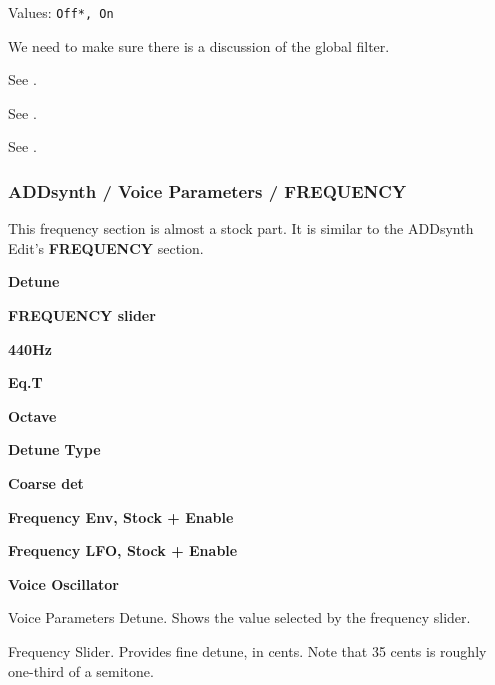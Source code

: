    Values: \texttt{Off*, On}

   We need to make sure there is a discussion of the global filter.

   See .

   See .

   See .

\subsubsection{ADDsynth / Voice Parameters / FREQUENCY}
\label{subsubsec:addsynth_voice_parameters_frequency}

   This frequency section is almost a stock part.
   It is similar to the ADDsynth Edit's \textbf{FREQUENCY} section.

   \begin{enumber}
      \item \textbf{Detune}
      \item \textbf{FREQUENCY slider}
      \item \textbf{440Hz}          %
      \item \textbf{Eq.T}          %
      \item \textbf{Octave}
      \item \textbf{Detune Type}
      \item \textbf{Coarse det}
      \item \textbf{Frequency Env, Stock + Enable}
      \item \textbf{Frequency LFO, Stock + Enable}
      \item \textbf{Voice Oscillator}
   \end{enumber}

   \setcounter{ItemCounter}{0}      %

   Voice Parameters Detune.
   Shows the value selected by the frequency slider.

   Frequency Slider.
   Provides fine detune, in cents.
   Note that 35 cents is roughly one-third of a semitone.

